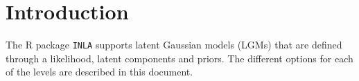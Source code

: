 \documentclass[12pt, a4paper]{book}
\begin{document}
\setcounter{tocdepth}{1}
\tableofcontents
\setcounter{tocdepth}{5}

\chapter{Introduction}
The \textsf{R} package \texttt{INLA} supports latent Gaussian models (LGMs)
that are defined through a likelihood, latent components and priors. The
different options for each of the levels are described in this document.





\end{document}
